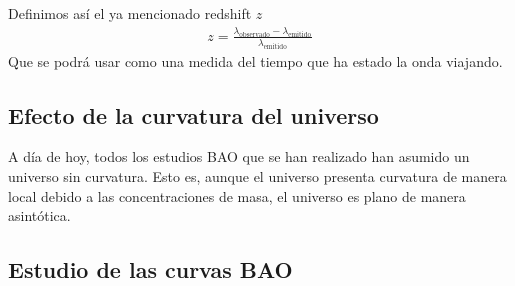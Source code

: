Definimos así el ya mencionado redshift $z$
\begin{align}
z = \frac{\lambda_{\text{observado}} - \lambda_{\text{emitido}}}{\lambda_{\text{emitido}}}
\end{align}
Que se podrá usar como una medida del tiempo que ha estado la onda viajando.

\subsection{Efecto de la curvatura del universo}

A día de hoy, todos los estudios BAO que se han realizado han asumido un universo sin curvatura. Esto es, aunque el universo presenta curvatura de manera local debido a las concentraciones de masa, el universo es plano de manera asintótica. 


\subsection{Estudio de las curvas BAO}

